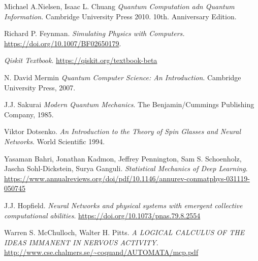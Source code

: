 \documentclass[a4paper]{article}
\begin{document}
\begin{thebibliography}{99}


 Michael A.Nielsen, Isaac L. Chuang \textit{Quantum Computation adn Quantum Information}. Cambridge University Press 2010. 10th. Anniversary Edition.

 Richard P. Feynman. \textit{Simulating Physics with Computers.} \url{https://doi.org/10.1007/BF02650179}.

 \textit{Qiskit Textbook}. \url{https://qiskit.org/textbook-beta}

 N. David Mermin \textit{Quantum Computer Science: An Introduction}. Cambridge University Press, 2007.

 J.J. Sakurai \textit{Modern Quantum Mechanics}. The Benjamin/Cummings Publishing Company, 1985.

 Viktor Dotsenko. \textit{An Introduction to the Theory of Spin Glasses and Neural Networks}. World Scientific 1994.

 Yasaman Bahri, Jonathan Kadmon, Jeffrey Pennington, Sam S. Schoenholz, Jascha Sohl-Dickstein, Surya Ganguli. \textit{Statistical Mechanics of Deep Learning}. \url{https://www.annualreviews.org/doi/pdf/10.1146/annurev-conmatphys-031119-050745}

 J.J. Hopfield. \textit{Neural Networks and physical systems with emergent collective computational abilities}. \url{https://doi.org/10.1073/pnas.79.8.2554}


 Warren S. McChulloch, Walter H. Pitts. \textit{A LOGICAL CALCULUS OF THE IDEAS IMMANENT IN NERVOUS ACTIVITY}. \url{http://www.cse.chalmers.se/~coquand/AUTOMATA/mcp.pdf}



\end{thebibliography}
\end{document}
